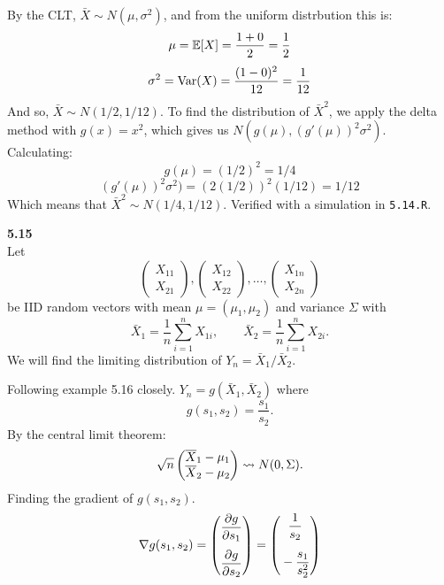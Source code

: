 \medskip\noindent
By the CLT, $\bar{X}\sim N(\mu, \sigma^2)$, and from the uniform distrbution this is:
$$
\mu = \mathbb{E}[X] = \frac{1 + 0}{2} = \frac{1}{2}
$$
$$
\sigma^2 = \text{Var}(X) = \frac{(1-0)^2}{12} = \frac{1}{12}
$$
And so, $\bar{X}\sim N(1/2, 1/12)$. To find the distribution of $\bar{X}^2$, we apply
the delta method with $g(x) = x^2$, which gives us $N(g(\mu), (g'(\mu))^2\sigma^2)$.
Calculating:
$$
g(\mu) = (1/2)^2 = 1/4
$$
$$
(g'(\mu))^2\sigma^2) = (2(1/2))^2(1/12) = 1/12
$$
Which means that $\bar{X}^2\sim N(1/4, 1/12)$. Verified with a simulation in \texttt{5.14.R}.

\bigskip\noindent
\textbf{5.15}\\  %
Let
$$
\begin{pmatrix}
    X_{11} \\
    X_{21}
\end{pmatrix},
\begin{pmatrix}
    X_{12} \\
    X_{22}
\end{pmatrix},
\ldots,
\begin{pmatrix}
    X_{1n} \\
    X_{2n}
\end{pmatrix}
$$
be IID random vectors with mean $\mu = (\mu_1, \mu_2)$ and variance $\Sigma$ with
$$
\bar{X}_1 = \frac{1}{n}\sum_{i=1}^n X_{1i},
\qquad
\bar{X}_2 = \frac{1}{n}\sum_{i=1}^n X_{2i}.
$$
We will find the limiting distribution of $Y_n = \bar{X}_1/\bar{X}_2$.

\medskip\noindent Following example 5.16 closely. $Y_n = g(\bar{X}_1, \bar{X}_2)$
where
$$
g(s_1, s_2) = \frac{s_1}{s_2}.
$$
By the central limit theorem:
$$
\sqrt{n}
\begin{pmatrix}
    \overline{X}_1 - \mu_1 \\
    \overline{X}_2 - \mu_2
\end{pmatrix}
\rightsquigarrow N(0, \Sigma).
$$
Finding the gradient of $g(s_1, s_2)$.
$$
\nabla g(s_1, s_2) =
\begin{pmatrix}
    \displaystyle\frac{\partial g}{\partial s_1} \\
    \rule{0pt}{21pt}\displaystyle\frac{\partial g}{\partial s_2}
\end{pmatrix}
=
\begin{pmatrix}
    \displaystyle\frac{1}{s_2} \\
    \rule{0pt}{21pt}\displaystyle-\frac{s_1}{s_2^2}
\end{pmatrix}
$$

